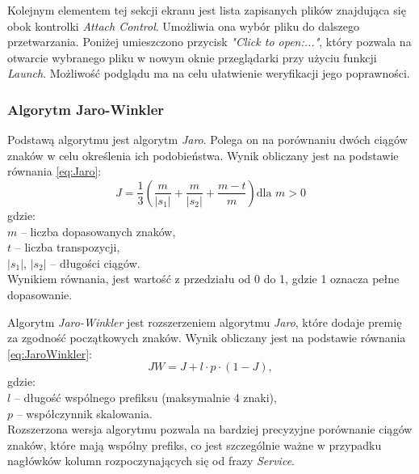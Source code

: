 Kolejnym elementem tej sekcji ekranu jest lista zapisanych plików znajdująca się obok kontrolki \emph{Attach Control}. Umożliwia ona wybór pliku do dalszego przetwarzania. Poniżej umieszczono przycisk \emph{"Click to open:..."}, który pozwala na otwarcie wybranego pliku w nowym oknie przeglądarki przy użyciu funkcji \emph{Launch}. Możliwość podglądu ma na celu ułatwienie weryfikacji jego poprawności.

\subsubsection*{Algorytm Jaro-Winkler}
Podstawą algorytmu jest algorytm \emph{Jaro}. Polega on na porównaniu dwóch ciągów znaków w celu określenia ich podobieństwa. Wynik obliczany jest na podstawie równania \ref{eq:Jaro}:
\begin{equation}
    \label{eq:Jaro}
    J = \frac{1}{3} \left( \frac{m}{|s_1|} + \frac{m}{|s_2|} + \frac{m - t}{m} \right) \mbox{dla } m>0
\end{equation}
\noindent gdzie:\\
$m$ – liczba dopasowanych znaków,\\    $t$ – liczba transpozycji,\\    $|s_1|$, $|s_2|$ – długości ciągów.\\

\noindent Wynikiem równania, jest wartość z przedziału od 0 do 1, gdzie 1 oznacza pełne dopasowanie.

Algorytm \emph{Jaro-Winkler} jest rozszerzeniem algorytmu \emph{Jaro}, które dodaje premię za zgodność początkowych znaków. Wynik obliczany jest na podstawie równania \ref{eq:JaroWinkler}:
\begin{equation}
    \label{eq:JaroWinkler}
    JW = J + l \cdot p \cdot (1 - J),
\end{equation}
gdzie:\\
$l$ – długość wspólnego prefiksu (maksymalnie 4 znaki),\\ $p$ – współczynnik skalowania.\\

\noindent Rozszerzona wersja algorytmu pozwala na bardziej precyzyjne porównanie ciągów znaków, które mają wspólny prefiks, co jest szczególnie ważne w przypadku nagłówków kolumn rozpoczynających się od frazy \emph{Service}.


\vspace{1cm}




